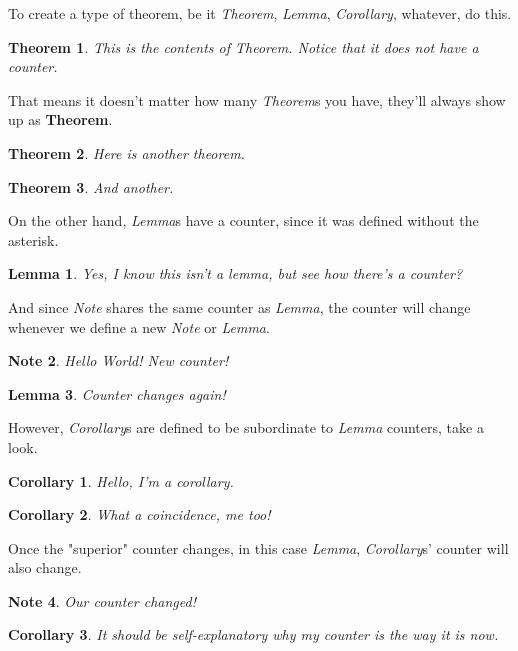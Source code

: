 \documentclass[12pt]{article}
\newtheorem*{Theorem}{Theorem}
\newtheorem{Lemma}{Lemma}
\newtheorem{Corollary}{Corollary}[Lemma]
\newtheorem{Note}[Lemma]{Note}
\begin{document}
To create a type of theorem, be it \emph{Theorem}, \emph{Lemma}, \emph{Corollary}, whatever, do this.

\begin{Theorem}
This is the contents of Theorem. Notice that it does not have a counter.
\end{Theorem}

That means it doesn't matter how many \emph{Theorem}s you have, they'll always show up as \textbf{Theorem}.

\begin{Theorem}
Here is another theorem.
\end{Theorem}

\begin{Theorem}
And another.
\end{Theorem}

On the other hand, \emph{Lemma}s have a counter, since it was defined without the asterisk.

\begin{Lemma}
Yes, I know this isn't a lemma, but see how there's a counter?
\end{Lemma}

And since \emph{Note} shares the same counter as \emph{Lemma}, the counter will change whenever we define
a new \emph{Note} or \emph{Lemma}.

\begin{Note}
Hello World! New counter!
\end{Note}

\begin{Lemma}
Counter changes again!
\end{Lemma}

However, \emph{Corollary}s are defined to be subordinate to \emph{Lemma} counters, take a look.

\begin{Corollary}
Hello, I'm a corollary.
\end{Corollary}

\begin{Corollary}
What a coincidence, me too!
\end{Corollary}

Once the "superior" counter changes, in this case \emph{Lemma}, \emph{Corollary}s' counter will also change.

\begin{Note}
Our counter changed!
\end{Note}

\begin{Corollary}
It should be self-explanatory why my counter is the way it is now.
\end{Corollary}
\end{document}
